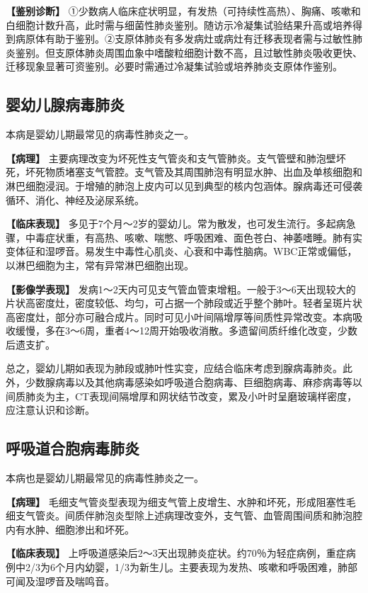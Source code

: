 \textbf{【鉴别诊断】}
①少数病人临床症状明显，有发热（可持续性高热）、胸痛、咳嗽和白细胞计数升高，此时需与细菌性肺炎鉴别。随访示冷凝集试验结果升高或培养得到病原体有助于鉴别。②支原体肺炎有多发病灶或病灶有迁移表现者需与过敏性肺炎鉴别。但支原体肺炎周围血象中嗜酸粒细胞计数不高，且过敏性肺炎吸收更快、迁移现象显著可资鉴别。必要时需通过冷凝集试验或培养肺炎支原体作鉴别。

\subsection{婴幼儿腺病毒肺炎}

本病是婴幼儿期最常见的病毒性肺炎之一。

\textbf{【病理】}
主要病理改变为坏死性支气管炎和支气管肺炎。支气管壁和肺泡壁坏死，坏死物质堵塞支气管腔。支气管及其周围肺泡有明显水肿、出血及单核细胞和淋巴细胞浸润。于增殖的肺泡上皮内可以见到典型的核内包涵体。腺病毒还可侵袭循环、消化、神经及泌尿系统。

\textbf{【临床表现】}
多见于7个月～2岁的婴幼儿。常为散发，也可发生流行。多起病急骤，中毒症状重，有高热、咳嗽、喘憋、呼吸困难、面色苍白、神萎嗜睡。肺有实变体征和湿啰音。易发生中毒性心肌炎、心衰和中毒性脑病。WBC正常或偏低，以淋巴细胞为主，常有异常淋巴细胞出现。

\textbf{【影像学表现】}
发病1～2天内可见支气管血管束增粗。一般于3～6天出现较大的片状高密度灶，密度较低、均匀，可占据一个肺段或近乎整个肺叶。轻者呈斑片状高密度灶，部分亦可融合成片。同时可见小叶间隔增厚等间质性异常改变。本病吸收缓慢，多在3～6周，重者4～12周开始吸收消散。多遗留间质纤维化改变，少数后遗支扩。

总之，婴幼儿期如表现为肺段或肺叶性实变，应结合临床考虑到腺病毒肺炎。此外，少数腺病毒以及其他病毒感染如呼吸道合胞病毒、巨细胞病毒、麻疹病毒等以间质肺炎为主，CT表现间隔增厚和网状结节改变，累及小叶时呈磨玻璃样密度，应注意认识和诊断。

\subsection{呼吸道合胞病毒肺炎}

本病也是婴幼儿期最常见的病毒性肺炎之一。

\textbf{【病理】}
毛细支气管炎型表现为细支气管上皮增生、水肿和坏死，形成阻塞性毛细支气管炎。间质伴肺泡炎型除上述病理改变外，支气管、血管周围间质和肺泡腔内有水肿、细胞渗出和坏死。

\textbf{【临床表现】}
上呼吸道感染后2～3天出现肺炎症状。约70％为轻症病例，重症病例中2/3为6个月内幼婴，1/3为新生儿。主要表现为发热、咳嗽和呼吸困难，肺部可闻及湿啰音及喘鸣音。

